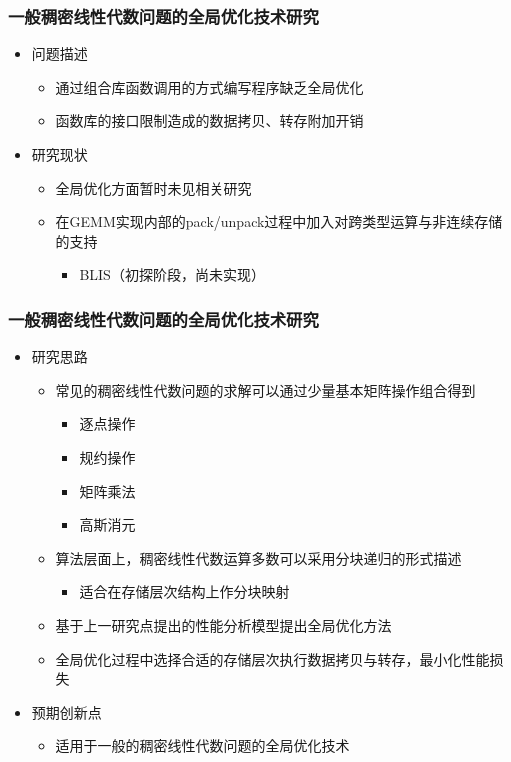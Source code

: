 \documentclass[aspectratio=169]{beamer}
\begin{document}
\begin{frame}
  \frametitle{一般稠密线性代数问题的全局优化技术研究}
  \begin{itemize}
  \item 问题描述
    \begin{itemize}
    \item 通过组合库函数调用的方式编写程序缺乏全局优化
    \item 函数库的接口限制造成的数据拷贝、转存附加开销
    \end{itemize}
  \item 研究现状
    \begin{itemize}
    \item 全局优化方面暂时未见相关研究
    \item 在GEMM实现内部的pack/unpack过程中加入对跨类型运算与非连续存储的支持
      \begin{itemize}
      \item BLIS（初探阶段，尚未实现）
      \end{itemize}
    \end{itemize}
  \end{itemize}
\end{frame}

\begin{frame}
  \frametitle{一般稠密线性代数问题的全局优化技术研究}
  \begin{itemize}
  \item 研究思路
    \begin{itemize}
    \item 常见的稠密线性代数问题的求解可以通过少量基本矩阵操作组合得到
      \begin{itemize}
      \item 逐点操作
      \item 规约操作
      \item 矩阵乘法
      \item 高斯消元
      \end{itemize}
    \item 算法层面上，稠密线性代数运算多数可以采用分块递归的形式描述
      \begin{itemize}
      \item 适合在存储层次结构上作分块映射
      \end{itemize}
    \item 基于上一研究点提出的性能分析模型提出全局优化方法
    \item 全局优化过程中选择合适的存储层次执行数据拷贝与转存，最小化性能损失
    \end{itemize}
  \item 预期创新点
    \begin{itemize}
    \item 适用于一般的稠密线性代数问题的全局优化技术
    \end{itemize}
  \end{itemize}
\end{frame}
\end{document}
